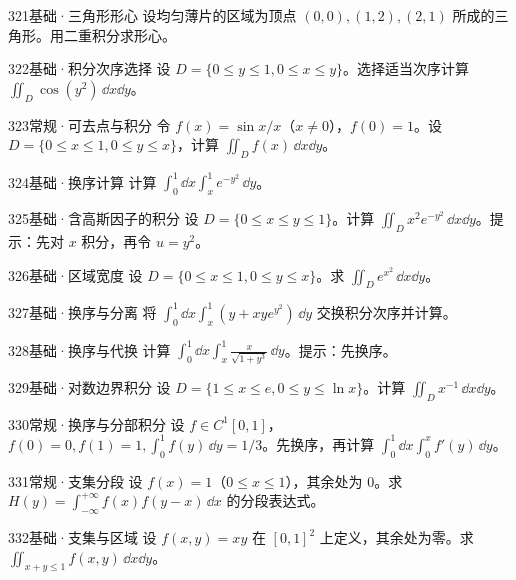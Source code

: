 \begin{exercise}{321}{基础·三角形形心}
设均匀薄片的区域为顶点 $(0,0),(1,2),(2,1)$ 所成的三角形。用二重积分求形心。
\end{exercise}
\begin{exercise}{322}{基础·积分次序选择}
设 $D=\{0\leq y\leq1,0\leq x\leq y\}$。选择适当次序计算 $\iint_D\cos(y^2)\,\dd x\dd y$。
\end{exercise}
\begin{exercise}{323}{常规·可去点与积分}
令 $f(x)=\sin x/x$（$x\ne0$），$f(0)=1$。设 $D=\{0\leq x\leq1,0\leq y\leq x\}$，计算 $\iint_Df(x)\,\dd x\dd y$。
\end{exercise}
\begin{exercise}{324}{基础·换序计算}
计算 $\int_0^1\dd x\int_x^1 e^{-y^2}\,\dd y$。
\end{exercise}
\begin{exercise}{325}{基础·含高斯因子的积分}
设 $D=\{0\leq x\leq y\leq1\}$。计算 $\iint_Dx^2e^{-y^2}\,\dd x\dd y$。提示：先对 $x$ 积分，再令 $u=y^2$。
\end{exercise}
\begin{exercise}{326}{基础·区域宽度}
设 $D=\{0\leq x\leq1,0\leq y\leq x\}$。求 $\iint_De^{x^2}\,\dd x\dd y$。
\end{exercise}
\begin{exercise}{327}{基础·换序与分离}
将 $\int_0^1\dd x\int_x^1(y+xye^{y^2})\,\dd y$ 交换积分次序并计算。
\end{exercise}
\begin{exercise}{328}{基础·换序与代换}
计算 $\int_0^1\dd x\int_x^1\frac{x}{\sqrt{1+y^3}}\,\dd y$。提示：先换序。
\end{exercise}
\begin{exercise}{329}{基础·对数边界积分}
设 $D=\{1\leq x\leq e,0\leq y\leq\ln x\}$。计算 $\iint_Dx^{-1}\,\dd x\dd y$。
\end{exercise}
\begin{exercise}{330}{常规·换序与分部积分}
设 $f\in C^1[0,1]$，$f(0)=0,f(1)=1,\int_0^1 f(y)\,\dd y=1/3$。先换序，再计算 $\int_0^1\dd x\int_0^x f'(y)\,\dd y$。
\end{exercise}
\begin{exercise}{331}{常规·支集分段}
设 $f(x)=1$（$0\leq x\leq1$），其余处为 $0$。求 $H(y)=\int_{-\infty}^{+\infty}f(x)f(y-x)\,\dd x$ 的分段表达式。
\end{exercise}
\begin{exercise}{332}{基础·支集与区域}
设 $f(x,y)=xy$ 在 $[0,1]^2$ 上定义，其余处为零。求 $\iint_{x+y\leq1}f(x,y)\,\dd x\dd y$。
\end{exercise}
